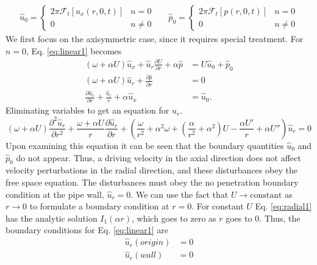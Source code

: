 \documentclass[superscriptaddress, onecolumn, prl]{revtex4}
\begin{document}
\begin{align}
\hat{u}_0 = 
\begin{cases}
2 \pi \mathscr{F}_t [u_x(r, 0, t)] & n=0 \\
0 & n \neq 0
\end{cases}
&&
\hat{p}_0 = 
\begin{cases}
2 \pi \mathscr{F}_t [p(r, 0, t)] & n=0 \\
0 & n \neq 0
\end{cases}
\end{align}  
We first focus on the axisymmetric case, since it requires special treatment. For $n=0$, Eq. \ref{eq:linear1} becomes
\begin{equation}
\label{eq:linear1}
\begin{split}
(\omega + \alpha U) \hat{u}_x + \hat{u}_r \frac{\partial U}{\partial r} + \alpha \hat{p} &= U \hat{u}_0 + \hat{p}_0 \\
(\omega + \alpha U) \hat{u}_r + \frac{\partial \hat{p}}{\partial r} &= 0 \\ 
\frac{\partial \hat{u}_r}{\partial r} + \frac{\hat{u}_r}{r} + \alpha \hat{u}_x &= \hat{u}_0.
\end{split}
\end{equation}
Eliminating variables to get an equation for $\hat{u}_r$.
\begin{equation}
\label{eq:radial1}
(\omega + \alpha U) \frac{\partial^2 \hat{u}_r}{\partial r^2} + \frac{\omega + \alpha U}{r}  \frac{\partial \hat{u}_r}{\partial r} + \left( \frac{\omega}{r^2} + \alpha^2 \omega + \left(\frac{\alpha}{r^2} + \alpha^2 \right) U - \frac{\alpha U'}{r} + \alpha U'' \right) \hat{u}_r = 0
\end{equation}
Upon examining this equation it can be seen that the boundary quantities $\hat{u}_0$ and $\hat{p}_0$ do not appear. Thus, a driving velocity in the axial direction does not affect velocity perturbations in the radial direction, and these disturbances obey the free space equation. The disturbances must obey the no penetration boundary condition at the pipe wall, $\hat{u}_r=0$. We can use the fact that $U \rightarrow \text{constant}$ as $r \rightarrow 0$ to formulate a boundary condition at $r=0$. For constant $U$ Eq. \ref{eq:radial1} has the analytic solution $I_1(\alpha r)$, which goes to zero as $r$ goes to $0$. Thus, the boundary conditions for Eq. \ref{eq:linear1} are
\begin{equation}
\label{eq:bc1}
\begin{split}
\hat{u}_r (origin) &= 0 \\
\hat{u}_r (wall) &= 0
\end{split}
\end{equation} 
 
\end{document}
